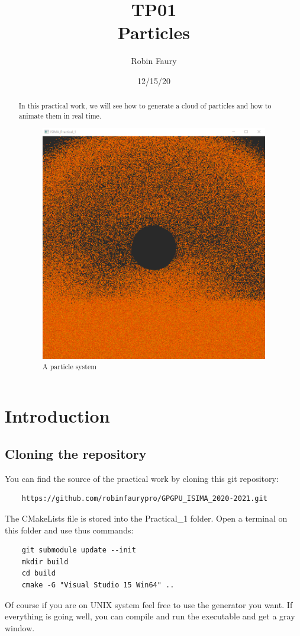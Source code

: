 \documentclass{article}
\begin{document}
\title{TP01\\Particles}
\author{Robin Faury}
\date{12/15/20}
\maketitle

\begin{abstract}
	In this practical work, we will see how to generate a cloud of particles and how to animate them in real time.
	\begin{figure}[h]
		\centering
		\includegraphics[scale=0.6]{images/result.png}
		\caption{A particle system}
	\end{figure}
\end{abstract}

\newpage
\section{Introduction}
\subsection{Cloning the repository}
You can find the source of the practical work by cloning this git repository:
\begin{lstlisting}
	https://github.com/robinfaurypro/GPGPU_ISIMA_2020-2021.git
\end{lstlisting}
The CMakeLists file is stored into the Practical\_1 folder. Open a terminal on this folder and use thus commands:
\begin{lstlisting}
	git submodule update --init
	mkdir build
	cd build
	cmake -G "Visual Studio 15 Win64" ..
\end{lstlisting}
Of course if you are on UNIX system feel free to use the generator you want.
If everything is going well, you can compile and run the executable and get a gray window.
\end{document}
